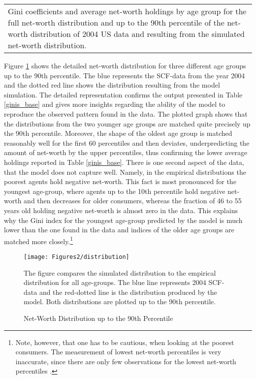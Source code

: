 \documentclass[a4paper,12pt,legno]{article}
\begin{document}
\begin{table}[!htbp]
\begin{tabular}{@{}lll@{}}
\multicolumn{3}{l}{%
  \begin{minipage}{8.5cm}%
    \small Gini coefficients and average net-worth holdings by age group for the full net-worth distribution and up to the 90th percentile of the net-worth distribution of 2004 US data and resulting from the simulated net-worth distribution. 
  \end{minipage}%
}\\
\end{tabular}
\end{table}

Figure \ref{wealth_distr_base} shows the detailed net-worth distribution for three different age groups up to the 90th percentile. The blue represents the SCF-data from the year 2004 and the dotted red line shows the distribution resulting from the model simulation. The detailed representation confirms the output presented in Table \ref{ginis_base} and gives more insights regarding the ability of the model to reproduce the observed pattern found in the data.
The plotted graph shows that the distributions from the two younger age groups are matched quite precisely up the 90th percentile. Moreover, the shape of the oldest age group is matched reasonably well for the first 60 percentiles and then deviates, underpredicting the amount of net-worth by the upper percentiles, thus confirming the lower average holdings reported in Table \ref{ginis_base}. There is one second aspect of the data, that the model does not capture well. Namely, in the empirical distributions the poorest agents hold negative net-worth. This fact is most pronounced for the youngest age-group, where agents up to the 10th percentile hold negative net-worth and then decreases for older consumers, whereas the fraction of 46 to 55 years old holding negative net-worth is almost zero in the data. This explains why the Gini index for the youngest age-group predicted by the model is much lower than the one found in the data and indices of the older age groups are matched more closely.\footnote{Note, however, that one has to be cautious, when looking at the poorest consumers. The measurement of lowest net-worth percentiles is very inaccurate, since there are only few observations for the lowest net-worth percentiles \citep{hintermaier2011}.} 
\begin{figure}[!htbp]
\caption{Net-Worth Distribution up to the 90th Percentile} 
\label{wealth_distr_base}	%
\centering
\texttt{[image: Figures2/distribution]}  %

\begin{minipage}{0.8\linewidth}
\footnotesize{The figure compares the simulated distribution to the empirical distribution for all age-groups. The blue line represents 2004 SCF-data and the red-dotted line is the distribution produced by the model. Both distributions are plotted up to the 90th percentile.}
\end{minipage}

\end{figure}
\end{document}

